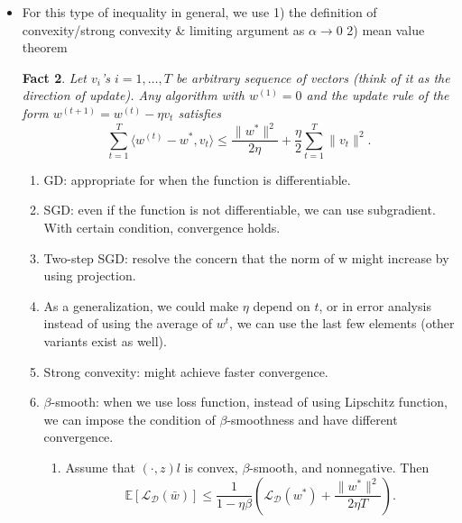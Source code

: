 \documentclass[11pt,reqno]{amsart}
\newtheorem{fact}{Fact}
\theoremstyle{remark}
\begin{document}
\begin{itemize}
\section*{Gradient Descent, Stochastic Gradient Descent}
\begin{fact}
If $f$ is $\lambda$-strongly convex then $\forall w,u,$ and $v\in\partial f(w)$, we have 
\[
\langle w-u, v\rangle \geq f(w)-f(u)+\frac{\lambda}2\lVert w-u\rVert^2
\]
\end{fact}
\begin{proof}
Use the definition of strong convexity, along with subgradient.
\end{proof}
\item For this type of inequality in general, we use 1) the definition of convexity/strong convexity \& limiting argument as $\alpha\to 0$
2) mean value theorem
\begin{fact}
Let $v_i$'s $i=1,\dots,T$ be arbitrary sequence of vectors (think of it as the direction of update).
 Any algorithm with $w^{(1)}=0$ and the update rule of the form $w^{(t+1)}=w^{(t)}-\eta v_t$ satisfies
 \[
\sum\limits^T_{t=1}\langle w^{(t)}-w^*,v_t\rangle\leq\frac{\lVert w^*\rVert^2}{2\eta}+\frac{\eta}2\sum\limits^T_{t=1}\lVert v_t\rVert^2.
\]
\end{fact}
\begin{enumerate}
\item GD: appropriate for when the function is differentiable.
\item SGD: even if the function is not differentiable, 
we can use subgradient. With certain condition, convergence holds. 
\item Two-step SGD: resolve the concern that the norm of w might increase by using projection.
\item As a generalization, we could make $\eta$ depend on $t$, or in error analysis instead of using the average of $w^{t}$, 
we can use the last few elements (other variants exist as well).
\item Strong convexity: might achieve faster convergence.
\item $\beta$-smooth: when we use loss function, instead of using Lipschitz
 function, we can impose the condition of $\beta$-smoothness and have different convergence.
\begin{enumerate}
\item Assume that $(\cdot, z)l$ is convex, $\beta$-smooth, and nonnegative. Then
\[
\mathbb{E}[\mathcal{L}_{\mathcal{D}}(\bar w)]\leq \frac 1{1-\eta\beta}(\mathcal{L}_\mathcal{D}(w^*)+\frac{\lVert w^*\rVert^2}{2\eta T}).
\]
\end{enumerate}
\end{enumerate}
\end{itemize}
\end{document}
